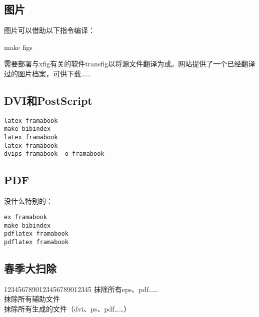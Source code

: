 \subsection{图片}

图片可以借助以下指令编译：

\begin{dmd}
make figs
\end{dmd}

\begin{exclamation}
需要部署与xfig有关的软件transfig以将源文件翻译为或。网站\linebreak {}提供了一个已经翻译过的图片档案，可供下载……
\end{exclamation}

\subsection{DVI和PostScript}

\begin{verbatim}
latex framabook
make bibindex
latex framabook
latex framabook
dvips framabook -o framabook\end{verbatim}

\subsection{PDF}

没什么特别的：

\begin{verbatim}
ex framabook 
make bibindex 
pdflatex framabook 
pdflatex framabook\end{verbatim}

\subsection{春季大扫除}

\begin{tabbing}
1234567890123456789012345\= \kill
{}\> \leftarrow 抹除所有eps、pdf……\\
\> \leftarrow 抹除所有辅助文件\\
\> \leftarrow 抹除所有生成的文件（dvi、ps、pdf……）
\end{tabbing}
